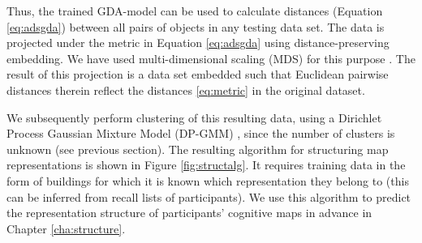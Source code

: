 
Thus, the trained GDA-model can be used to calculate distances (Equation \ref{eq:adsgda}) between all pairs of objects in any testing data set. The data is projected under the metric in Equation \ref{eq:adsgda} using distance-preserving embedding. We have used multi-dimensional scaling (MDS) for this purpose \citep{borg2005modern}. The result of this projection is a data set embedded such that Euclidean pairwise distances therein reflect the distances \ref{eq:metric} in the original dataset.

We subsequently perform clustering of this resulting data, using a Dirichlet Process Gaussian Mixture Model (DP-GMM) \citep{rasmussen1999infinite}, since the number of clusters is unknown (see previous section). The resulting algorithm for structuring map representations is shown in Figure \ref{fig:structalg}. It requires training data in the form of buildings for which it is known which representation they belong to (this can be inferred from recall lists of participants). We use this algorithm to predict the representation structure of participants' cognitive maps in advance in Chapter \ref{cha:structure}.

